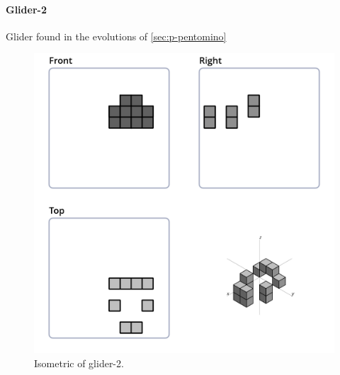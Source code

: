 \paragraph{Glider-2}
Glider found in the evolutions of \ref{sec:p-pentomino}
\begin{figure}
	\centering
	\includegraphics[scale=0.3]{iso_settings/glider_2.png}
	\caption{Isometric of glider-2.}
  \label{fig:iso-glider-2}
\end{figure}

